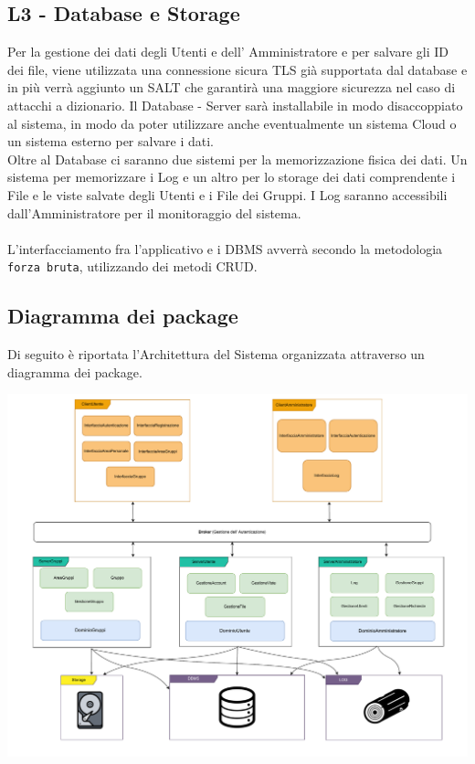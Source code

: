 \subsection*{L3 - Database e Storage}
Per la gestione dei dati degli Utenti e dell' Amministratore e per salvare gli ID dei file, viene utilizzata una connessione sicura TLS già supportata dal database e in più verrà aggiunto un SALT che garantirà una maggiore sicurezza nel caso di attacchi a dizionario.
Il Database - Server sarà installabile in modo disaccoppiato al sistema, in modo da poter utilizzare anche eventualmente un sistema Cloud o un sistema esterno per salvare i dati.
\\
Oltre al Database ci saranno due sistemi per la memorizzazione fisica dei dati. Un sistema per memorizzare i Log e un altro per lo storage dei dati comprendente i File e le viste salvate degli Utenti e i File dei Gruppi.
I Log saranno accessibili dall'Amministratore per il monitoraggio del sistema.
\\
\\
L'interfacciamento fra l'applicativo e i DBMS avverrà secondo la metodologia \verb|forza bruta|, utilizzando dei metodi CRUD.

\vspace{0.5cm}

\pagebreak
{}
\subsection*{Diagramma dei package}
Di seguito è riportata l’Architettura del Sistema organizzata attraverso un diagramma dei package.
\vspace{2cm}

\begin{adjustwidth}{-3cm}{0cm}
\includegraphics[scale=0.55]{progettazione/Progettazione-Diagramma Package.drawio.pdf}
\end{adjustwidth}


